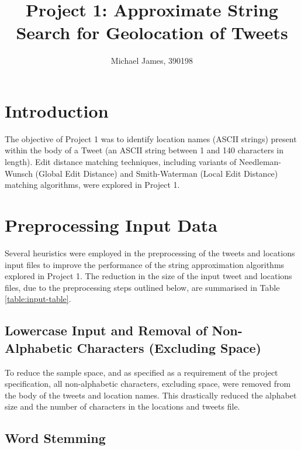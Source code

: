 \documentclass[11pt,a4paper]{article}
\author{Michael James, 390198}
\begin{document}
\title{Project 1: Approximate String Search for Geolocation of Tweets}
\maketitle

\section{Introduction}
The objective of Project 1 was to identify location names (ASCII strings) present within the body of a Tweet (an ASCII string between 1 and 140 characters in length). Edit distance matching techniques, including variants of Needleman-Wunsch (Global Edit Distance) and  Smith-Waterman (Local Edit Distance) matching algorithms, were explored in Project 1. 

\section{Preprocessing Input Data}  

Several heuristics were employed in the preprocessing of the tweets and locations input files to improve the performance of the string approximation algorithms explored in Project 1. The reduction in the size of the input tweet and locations files, due to the preprocessing steps outlined below, are summarised in Table \ref{table:input-table}.

\subsection{Lowercase Input and Removal of Non-Alphabetic Characters (Excluding Space)}
\label{subsec:alpha}

To reduce the sample space, and as specified as a requirement of the project specification, all non-alphabetic characters, excluding space, were removed from the body of the tweets and location names. This drastically reduced the alphabet size and the number of characters in the locations and tweets file.

\subsection{Word Stemming}
\end{document}

